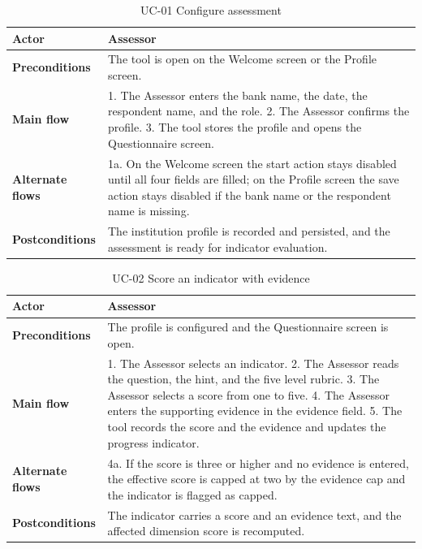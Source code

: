 \begin{table}[H]
\centering
\caption{UC-01 Configure assessment}
\label{tab:uc01}
\begin{tabular}{|p{3cm}|p{12cm}|}
\hline
\textbf{Actor} & Assessor \\
\hline
\textbf{Preconditions} & The tool is open on the Welcome screen or the Profile screen. \\
\hline
\textbf{Main flow} & 1. The Assessor enters the bank name, the date, the respondent name, and the role. 2. The Assessor confirms the profile. 3. The tool stores the profile and opens the Questionnaire screen. \\
\hline
\textbf{Alternate flows} & 1a. On the Welcome screen the start action stays disabled until all four fields are filled; on the Profile screen the save action stays disabled if the bank name or the respondent name is missing. \\
\hline
\textbf{Postconditions} & The institution profile is recorded and persisted, and the assessment is ready for indicator evaluation. \\
\hline
\end{tabular}
\end{table}

\begin{table}[H]
\centering
\caption{UC-02 Score an indicator with evidence}
\label{tab:uc02}
\begin{tabular}{|p{3cm}|p{12cm}|}
\hline
\textbf{Actor} & Assessor \\
\hline
\textbf{Preconditions} & The profile is configured and the Questionnaire screen is open. \\
\hline
\textbf{Main flow} & 1. The Assessor selects an indicator. 2. The Assessor reads the question, the hint, and the five level rubric. 3. The Assessor selects a score from one to five. 4. The Assessor enters the supporting evidence in the evidence field. 5. The tool records the score and the evidence and updates the progress indicator. \\
\hline
\textbf{Alternate flows} & 4a. If the score is three or higher and no evidence is entered, the effective score is capped at two by the evidence cap and the indicator is flagged as capped. \\
\hline
\textbf{Postconditions} & The indicator carries a score and an evidence text, and the affected dimension score is recomputed. \\
\hline
\end{tabular}
\end{table}

